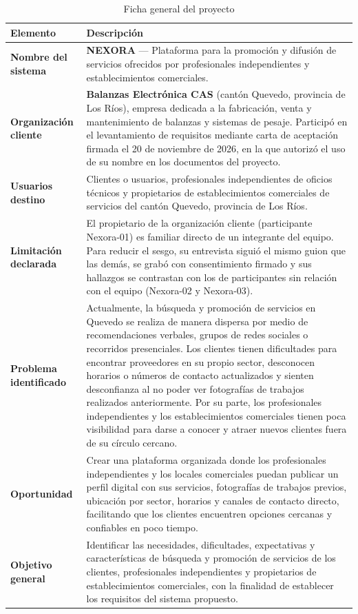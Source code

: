 \documentclass[11pt,a4paper]{article}
\begin{document}
\begin{table}[H]
\centering
\caption{Ficha general del proyecto}
\label{tab:ficha}
\small
\begin{tabularx}{\textwidth}{|L{3.8cm}|Y|}
\hline
{}
\textbf{Elemento} & \textbf{Descripci\'on} \\
\hline
\textbf{Nombre del sistema} & \textbf{NEXORA} --- Plataforma para la promoci\'on y difusi\'on de servicios ofrecidos por profesionales independientes y establecimientos comerciales. \\
\hline
\textbf{Organizaci\'on cliente} & \textbf{Balanzas Electr\'onica CAS} (cant\'on Quevedo, provincia de Los R\'ios), empresa dedicada a la fabricaci\'on, venta y mantenimiento de balanzas y sistemas de pesaje. Particip\'o en el levantamiento de requisitos mediante carta de aceptaci\'on firmada el 20 de noviembre de 2026, en la que autoriz\'o el uso de su nombre en los documentos del proyecto. \\
\hline
\textbf{Usuarios destino} & Clientes o usuarios, profesionales independientes de oficios t\'ecnicos y propietarios de establecimientos comerciales de servicios del cant\'on Quevedo, provincia de Los R\'ios. \\
\hline
\textbf{Limitaci\'on declarada} & El propietario de la organizaci\'on cliente (participante Nexora-01) es familiar directo de un integrante del equipo. Para reducir el sesgo, su entrevista sigui\'o el mismo guion que las dem\'as, se grab\'o con consentimiento firmado y sus hallazgos se contrastan con los de participantes sin relaci\'on con el equipo (Nexora-02 y Nexora-03). \\
\hline
\textbf{Problema identificado} & Actualmente, la b\'usqueda y promoci\'on de servicios en Quevedo se realiza de manera dispersa por medio de recomendaciones verbales, grupos de redes sociales o recorridos presenciales. Los clientes tienen dificultades para encontrar proveedores en su propio sector, desconocen horarios o n\'umeros de contacto actualizados y sienten desconfianza al no poder ver fotograf\'ias de trabajos realizados anteriormente. Por su parte, los profesionales independientes y los establecimientos comerciales tienen poca visibilidad para darse a conocer y atraer nuevos clientes fuera de su c\'irculo cercano. \\
\hline
\textbf{Oportunidad} & Crear una plataforma organizada donde los profesionales independientes y los locales comerciales puedan publicar un perfil digital con sus servicios, fotograf\'ias de trabajos previos, ubicaci\'on por sector, horarios y canales de contacto directo, facilitando que los clientes encuentren opciones cercanas y confiables en poco tiempo. \\
\hline
\textbf{Objetivo general} & Identificar las necesidades, dificultades, expectativas y caracter\'isticas de b\'usqueda y promoci\'on de servicios de los clientes, profesionales independientes y propietarios de establecimientos comerciales, con la finalidad de establecer los requisitos del sistema propuesto. \\
\hline
\end{tabularx}
\end{table}
\end{document}
